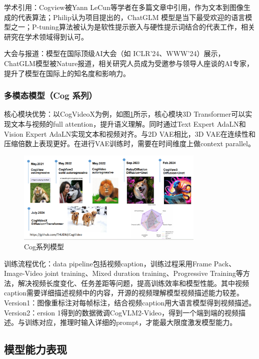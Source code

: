 学术引用：Cogview被Yann LeCun等学者在多篇文章中引用，作为文本到图像生成的代表算法；Philip认为项目提出的，ChatGLM 模型是当下最受欢迎的语言模型之一；P-tuning算法被认为是软性提示嵌入与硬性提示词结合的代表工作，相关研究在学术领域得到认可。

大会与报道：模型在国际顶级AI大会（如 ICLR’24、WWW’24）展示，ChatGLM模型被Nature报道，相关研究人员成为受邀参与领导人座谈的AI专家，提升了模型在国际上的知名度和影响力。

\subsubsection{多模态模型（Cog 系列）}

核心模块优势：以CogVideoX为例，如图\ref{fig:cogvideox}所示，核心模块3D Transformer可以实现文本与视频的full attention，提升语义理解。同时通过Text Expert AdaLN和Vision Expert AdaLN实现文本和视频对齐。与2D VAE相比，3D VAE在连续性和压缩倍数上表现更好。在进行VAE训练时，需要在时间维度上做context parallel。

\begin{figure}[H]
	\centering
	\includegraphics[width=0.8\textwidth]{figures/chapter1/fig13.png}
	\caption{Cog系列模型}
	\label{fig:cogvideox}
\end{figure}

训练流程优化：data pipeline包括视频caption，训练过程采用Frame Pack、Image-Video joint training、Mixed duration training、Progressive Training等方法，解决视频长度变化、任务差距等问题，提高训练效率和模型性能。其中视频caption需要详细描述视频中的内容，开源的视频理解模型视频描述能力较差。Version1：图像重标注对每帧标注，结合视频caption用大语言模型得到视频描述。Version2：ersion 1得到的数据微调CogVLM2-Video，得到一个端到端的视频描述。与训练对应，推理时输入详细的prompt，才能最大限度激发模型能力。

\subsection{模型能力表现}


